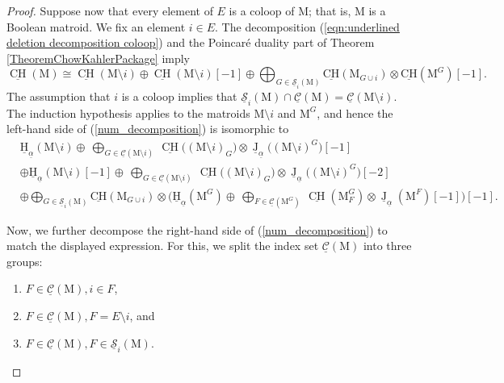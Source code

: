 \documentclass[11pt,reqno]{amsart}
\theoremstyle{definition}
\theoremstyle{remark}
\renewcommand{\(}{\left(}
\renewcommand{\)}{\right)}
\newcommand{\<}{\left<}
\renewcommand{\>}{\right>}
\newcommand{\uJ}{\underline{\operatorname{J}}}
\newcommand{\CH}{\operatorname{CH}}
\newcommand{\uCH}{\underline{\CH}}
\begin{document}
\begin{proof}
Suppose now that every element of $E$ is a coloop of $\mathrm{M}$; that is, $\mathrm{M}$ is a Boolean matroid. We fix an element $i\in E$. The decomposition (\ref{eqn:underlined deletion decomposition coloop}) and the Poincar\'{e} duality part of Theorem \ref{TheoremChowKahlerPackage} imply
\[
\underline{\CH}(\mathrm{M})\cong \uCH(\mathrm{M}\setminus i)\oplus \uCH(\mathrm{M}\setminus i)[-1] \oplus \bigoplus_{G \in \underline{\mathscr{S}}_i(\mathrm{M})} \underline{\mathrm{CH}}(\mathrm{M}_{G\cup i}) \otimes  \underline{\mathrm{CH}}(\mathrm{M}^{G})[-1]. 
\]
The assumption that $i$ is a coloop implies that $\underline{\mathscr{S}}_i(\mathrm{M}) \cap \underline{\mathscr{C}}(\mathrm{M}) =\underline{\mathscr{C}}(\mathrm{M}\setminus i)$.  The induction hypothesis applies to the matroids $\mathrm{M}\setminus i$ and $\mathrm{M}^G$, and hence
the left-hand side of (\ref{num_decomposition}) is isomorphic to 
\begin{align*}
& \underline{\mathrm{H}}_{\underline{\alpha}}(\mathrm{M}\setminus i) \oplus \ \bigoplus_{G\in \underline{\mathscr{C}}(\mathrm{M}\setminus i)}  \  \uCH\big((\mathrm{M}\setminus i)_G\big)\otimes \uJ_{\underline{\alpha}}\big((\mathrm{M}\setminus i)^G\big)[-1]\\
&\oplus \underline{\mathrm{H}}_{\underline{\alpha}}(\mathrm{M}\setminus i)[-1] \oplus \ \bigoplus_{G\in \underline{\mathscr{C}}(\mathrm{M}\setminus i)}  \  \uCH\big((\mathrm{M}\setminus i)_G\big)\otimes \uJ_{\underline{\alpha}}\big((\mathrm{M}\setminus i)^G\big)[-2]\\
&\oplus \bigoplus_{G \in \underline{\mathscr{S}}_i(\mathrm{M})} \underline{\mathrm{CH}}(\mathrm{M}_{G\cup i}) \otimes  \Big(\underline{\mathrm{H}}_{\underline{\alpha}}(\mathrm{M}^G) \oplus \ \bigoplus_{F\in \underline{\mathscr{C}}(\mathrm{M}^G)}  \  \uCH(\mathrm{M}^G_F)\otimes \uJ_{\underline{\alpha}}(\mathrm{M}^F)[-1]\Big)[-1].
\end{align*}

Now, we further decompose the right-hand side of (\ref{num_decomposition}) to match the displayed expression.
For this, we split the index set $\underline{\mathscr{C}}(\mathrm{M})$ into three groups:
\begin{enumerate}[(1)]\itemsep 5pt
\item $F\in \underline{\mathscr{C}}({\mathrm{M}}), i\in F$,
\item $F\in \underline{\mathscr{C}}({\mathrm{M}}), F=E \setminus i$, and
\item $F\in \underline{\mathscr{C}}({\mathrm{M}}), F \in \underline{\mathscr{S}}_i({\mathrm{M}})$.
\end{enumerate}


\end{proof}
\end{document}
